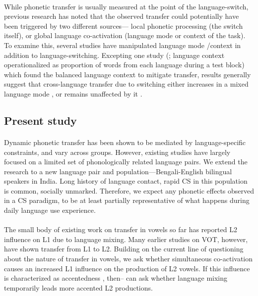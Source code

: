 \documentclass[11pt]{article}
\begin{document}
\paragraph{}While phonetic transfer is usually measured at the point of the language-switch, previous  research has noted that the observed transfer could potentially have been triggered by two different sources— local phonetic processing (the switch itself), or global language co-activation (language mode \cite{grosjean1998studying} or context of the task). To examine this, several studies have manipulated language mode /context in addition to language-switching. Excepting one study (; language context operationalized as proportion of words from each language during a test block) which found the balanced language context to mitigate transfer, results generally suggest that cross-language transfer due to switching either increases in a mixed language mode \cite{simonet2014phonetic}, or remains unaffected by it \cite{schwartz2015language,vsimavckova2015immediate,olson2016role,simonet2020increased}.


\subsection{Present study}
\paragraph{}Dynamic phonetic transfer has been shown to be mediated by language-specific constraints, and vary across groups. However, existing studies have largely focused on a limited set of phonologically related language pairs. We extend the research to a new language pair and population—Bengali-English bilingual speakers in India. Long history of language contact, rapid CS in this population is common, socially unmarked. Therefore, we expect any phonetic effects observed in a CS paradigm, to be at least partially representative of what happens during daily language use experience.

\paragraph{}The small body of existing work on transfer in vowels so far has reported L2 influence on L1 due to language mixing. Many earlier studies on VOT, however, have shown transfer from L1 to L2. Building on the current line of questioning about the nature of transfer in vowels, we ask whether simultaneous co-activation causes an increased L1 influence on the production of L2 vowels. If this influence is characterized as accentedness \cite{goldrick2014language}, then-- can ask whether language mixing temporarily leads more accented L2 productions. 
\end{document}
